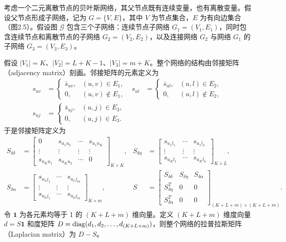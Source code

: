 考虑一个二元离散节点的贝叶斯网络，其父节点既有连续变量，也有离散变量。假设父节点形成子网络，记为 $G=\{V,E\}$，其中 $V$ 为节点集合，$E$ 为有向边集合（图2.5）。假设图 $\mathcal G$ 包含三个子网络：连续节点子网络 $G_1=(V_1,E_1)$，同时包含连续节点和离散节点的子网络 $G_2=(V_2,E_2)$，以及连接网络 $G_2$ 与网络 $G_1$ 的子网络 $G_3=(V_3,E_3)$。
\begin{figure}[htbp]
\centering
{}
\end{figure}
假设 $|V_1|=K$、$|V_2|=L+K-1$、$|V_3|=m+K$。整个网络的结构由邻接矩阵（adjacency matrix）刻画。邻接矩阵的元素定义为
\[
\begin{aligned}
s_{uv}&=\begin{cases}\bar s_{uv},&(u,v)\in E_1,\\0,&(u,v)\notin E_1,\end{cases}
&
s_{ul}&=\begin{cases}\bar s_{ul},&(u,l)\in E_2,\\0,&(u,l)\notin E_2,\end{cases}\\
s_{uj}&=\begin{cases}\bar s_{uj},&(u,j)\in E_3,\\0,&(u,j)\in E_3.\end{cases}
\end{aligned}
\]
于是邻接矩阵定义为
\[
\begin{aligned}
S_{\delta\delta}
&=\begin{bmatrix}
0&s_{u_1u_2}&\cdots&s_{u_1u_K}\\
\vdots&\vdots&\vdots&\vdots\\
s_{u_Ku_1}&s_{u_Ku_2}&\cdots&0
\end{bmatrix}_{K\times K},
&
S_{\delta\eta}
&=\begin{bmatrix}
s_{u_1l_1}&\cdots&s_{u_1l_L}\\
\vdots&\vdots&\vdots\\
s_{u_Kl_1}&\cdots&s_{u_Kl_L}
\end{bmatrix}_{K\times L},\\
S_{\delta\alpha}
&=\begin{bmatrix}
s_{u_1j_1}&\cdots&s_{u_1j_m}\\
\vdots&\vdots&\vdots\\
s_{u_kj_1}&\cdots&s_{u_kj_m}
\end{bmatrix}_{K\times m},
&
S&=\begin{bmatrix}
S_{\delta\delta}&S_{\delta\eta}&S_{\delta\alpha}\\
S_{\delta\eta}^T&0&0\\
S_{\delta\alpha}^T&0&0
\end{bmatrix}_{(K+L+m)\times(K+L+m)}.
\end{aligned}
\]
令 $\mathbf1$ 为各元素均等于 1 的 $(K+L+m)$ 维向量。定义 $(K+L+m)$ 维度向量 $d=S\mathbf1$ 和度矩阵 $D=\operatorname{diag}(d_1,d_2,\ldots,d_{(K+L+m)})$，则整个网络的拉普拉斯矩阵（Laplacian matrix）为 $D-S$。

